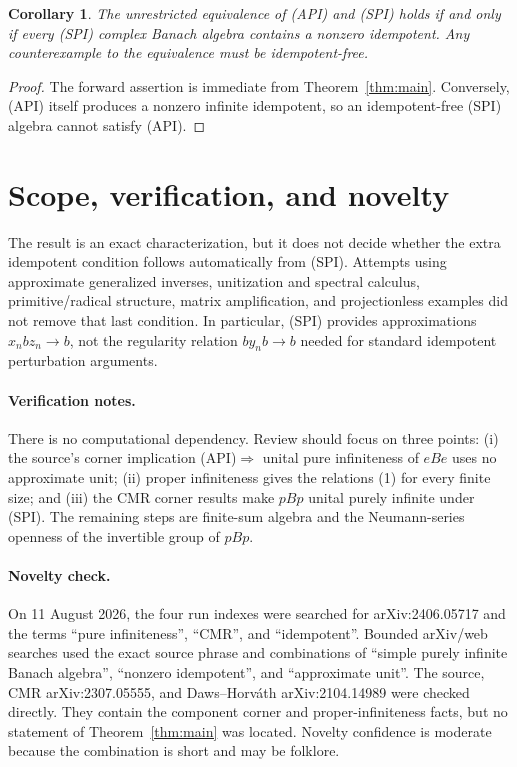 \documentclass[11pt]{article}
\newtheorem{corollary}[theorem]{Corollary}
\begin{document}
\begin{corollary}
The unrestricted equivalence of (API) and (SPI) holds if and only if every
(SPI) complex Banach algebra contains a nonzero idempotent.  Any counterexample
to the equivalence must be idempotent-free.
\end{corollary}

\begin{proof}
The forward assertion is immediate from Theorem~\ref{thm:main}.  Conversely,
(API) itself produces a nonzero infinite idempotent, so an idempotent-free
(SPI) algebra cannot satisfy (API).
\end{proof}

\section{Scope, verification, and novelty}

The result is an exact characterization, but it does not decide whether the
extra idempotent condition follows automatically from (SPI).  Attempts using
approximate generalized inverses, unitization and spectral calculus,
primitive/radical structure, matrix amplification, and projectionless
examples did not remove that last condition.  In particular, (SPI) provides
approximations $x_nbz_n\to b$, not the regularity relation $by_nb\to b$
needed for standard idempotent perturbation arguments.

\paragraph{Verification notes.}
There is no computational dependency.  Review should focus on three points:
(i) the source's corner implication (API)$\Rightarrow$ unital pure
infiniteness of $eBe$ uses no approximate unit; (ii) proper infiniteness gives
the relations (1) for every finite size; and (iii) the CMR corner results make
$pBp$ unital purely infinite under (SPI).  The remaining steps are finite-sum
algebra and the Neumann-series openness of the invertible group of $pBp$.

\paragraph{Novelty check.}
On 11 August 2026, the four run indexes were searched for arXiv:2406.05717 and
the terms ``pure infiniteness'', ``CMR'', and ``idempotent''.  Bounded
arXiv/web searches used the exact source phrase and combinations of ``simple
purely infinite Banach algebra'', ``nonzero idempotent'', and ``approximate
unit''.  The source, CMR arXiv:2307.05555, and Daws--Horv\'ath
arXiv:2104.14989 were checked directly.  They contain the component corner and
proper-infiniteness facts, but no statement of Theorem~\ref{thm:main} was
located.  Novelty confidence is moderate because the combination is short and
may be folklore.
\end{document}
